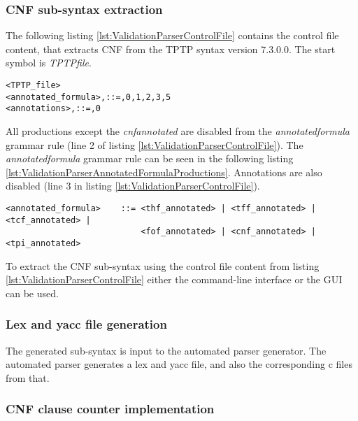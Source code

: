 \subsubsection{\ac{CNF} sub-syntax extraction}\label{sec:ValidationAutomatedParserGenerationBuildingBasicParserSubSyntax}

The following listing \ref{lst:ValidationParserControlFile} contains the control file content, that extracts \ac{CNF} from the TPTP syntax version 7.3.0.0.
The start symbol is \textit{TPTP\textunderscore file}.
\begin{lstlisting}[language = None, caption= Control file to extract \ac{CNF}, label= lst:ValidationParserControlFile]
<TPTP_file>
<annotated_formula>,::=,0,1,2,3,5
<annotations>,::=,0
\end{lstlisting}

All productions except the \textit{cnf\textunderscore annotated} are disabled from the \textit{annotated\textunderscore formula} grammar rule (line 2 of listing \ref{lst:ValidationParserControlFile}).
The \textit{annotated\textunderscore formula} grammar rule can be seen in the following listing \ref{lst:ValidationParserAnnotatedFormulaProductions}.
Annotations are also disabled (line 3 in listing \ref{lst:ValidationParserControlFile}).
\begin{lstlisting}[language = None,caption= \textit{annotated\textunderscore formula} production rule, label= lst:ValidationParserAnnotatedFormulaProductions]
<annotated_formula>    ::= <thf_annotated> | <tff_annotated> | <tcf_annotated> |
                           <fof_annotated> | <cnf_annotated> | <tpi_annotated>
\end{lstlisting}

To extract the \ac{CNF} sub-syntax using the control file content from listing \ref{lst:ValidationParserControlFile} either the command-line interface or the GUI can be used.

\subsubsection{Lex and yacc file generation}\label{sec:ValidationAutomatedParserGenerationBuildingBasicParserGenerateFiles}

The generated sub-syntax is input to the automated parser generator.
The automated parser generates  a lex and yacc file, and also the corresponding c files from that.

\subsubsection{\ac{CNF} clause counter implementation}\label{sec:ValidationAutomatedParserGenerationBuildingBasicParserClauseCounter}

